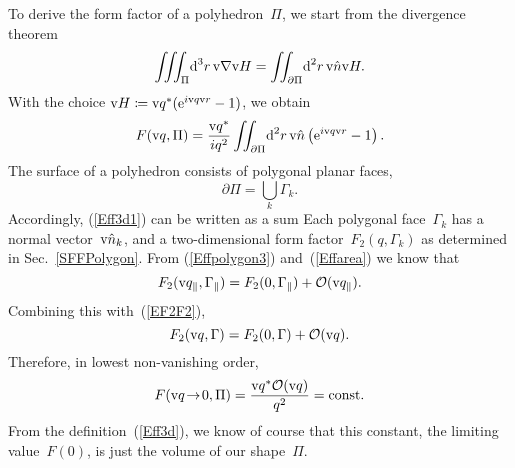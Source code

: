 To derive the form factor of a polyhedron~$\Pi$,
we start from the divergence theorem
\begin{equation}
  \iiint_\Pi\!\text{d}^3r\,\text{v}{\nabla}\text{v}{H} = \iint_{\partial\Pi}\!\text{d}^2r\, \text{v}{\hat n}\text{v}{H}.
\end{equation}
With the choice $\text{v}{H}\coloneqq\text{v}{q}^*(\text{e}^{i\text{v}{q}\text{v}{r}}-1)$,
we obtain
\begin{equation}\label{Eff3d1}
  F(\text{v}{q},\Pi) = \frac{\text{v}{q}^*}{iq^2} \iint_{\partial\Pi}\!\text{d}^2r\, \text{v}{\hat n} \left(\text{e}^{i\text{v}{q}\text{v}{r}}-1\right).
\end{equation}
The surface of a polyhedron consists of polygonal planar faces,
\begin{equation}
  \partial\Pi = \bigcup_k \Gamma_k.
\end{equation}
Accordingly, (\ref{Eff3d1}) can be written as a sum
Each polygonal face~$\Gamma_k$ has a normal vector~$\text{v}{\hat n}_k$, 
and a two-dimensional form factor~$F_2(q,\Gamma_k)$ as determined in Sec.~\ref{SFFPolygon}.
From (\ref{Effpolygon3}) and~(\ref{Effarea})
we know that
\begin{equation}
  F_2(\text{v}{q}_\parallel,\Gamma_\parallel)=F_2(0,\Gamma_\parallel)+\mathcal{O}(\text{v}{q}_\parallel).
\end{equation}
Combining this with~(\ref{EF2F2}),
\begin{equation}
  F_2(\text{v}{q},\Gamma)=F_2(0,\Gamma)+\mathcal{O}(\text{v}{q}).
\end{equation}
Therefore, in lowest non-vanishing order,
\begin{equation}
  F(\text{v}{q}\!\to\!0,\Pi)=\frac{\text{v}{q}^*\mathcal{O}(\text{v}{q})}{q^2}=\text{const}.
\end{equation}
From the definition~(\ref{Eff3d}),
we know of course that this constant, the limiting value~$F(0)$,
is just the volume of
our shape~$\Pi$.



